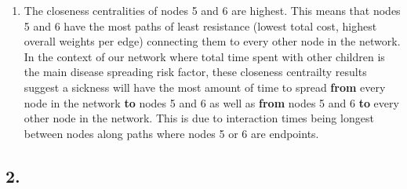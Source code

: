 \documentclass{article}
\begin{document}
\begin{enumerate}[label=(\alph*), left=10pt, itemsep=10pt]
        \item \begin{minipage}[t]{0.9\textwidth}
            The closeness centralities of nodes 5 and 6 are highest. This means that nodes 5 and 6 have the most paths
            of least resistance (lowest total cost, highest overall weights per edge) connecting them to every other node in
            the network. In the context of our network where total time spent with other children is the main disease spreading
            risk factor, these closeness centrailty results suggest a sickness will have the most amount of time to spread
            \textbf{from} every node in the network \textbf{to} nodes 5 and 6 as well as \textbf{from} nodes 5 and 6 \textbf{to}
            every other node in the network. This is due to interaction times being longest between nodes along paths where nodes
            5 or 6 are endpoints.
        \end{minipage}

    \end{enumerate}


    \subsection*{2.}
\end{document}
